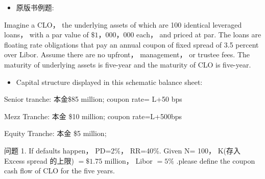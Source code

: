 \begin{itemize}
\item 原版书例题:
\end{itemize}

Imagine a CLO， the underlying assets of which are 100 identical leveraged loans， with a par value of \(\$ 1，{000}，{000}\) each， and priced at par. The loans are floating rate obligations that pay an annual coupon of fixed spread of 3.5 percent over Libor. Assume there are no upfront， management， or trustee fees. The maturity of underlying assets is five-year and the maturity of CLO is five-year.

\begin{itemize}
\item Capital structure displayed in this schematic balance sheet:
\end{itemize}

Senior tranche: 本金\$85 million; coupon rate= L+50 bps

Mezz Tranche: 本金 \$10 million; coupon rate=L+500bps

Equity Tranche: 本金 \$5 million;

 问题 1. If defaults happen， PD=2\%， RR=40\%. Given N= 100， K(存入 Excess spread 的上限) \(= \$ {1.75}\) million， Libor \(= 5\%\) .please define the coupon cash flow of CLO for the five years.

\begin{center}
\end{center}

\begin{center}
\end{center}

